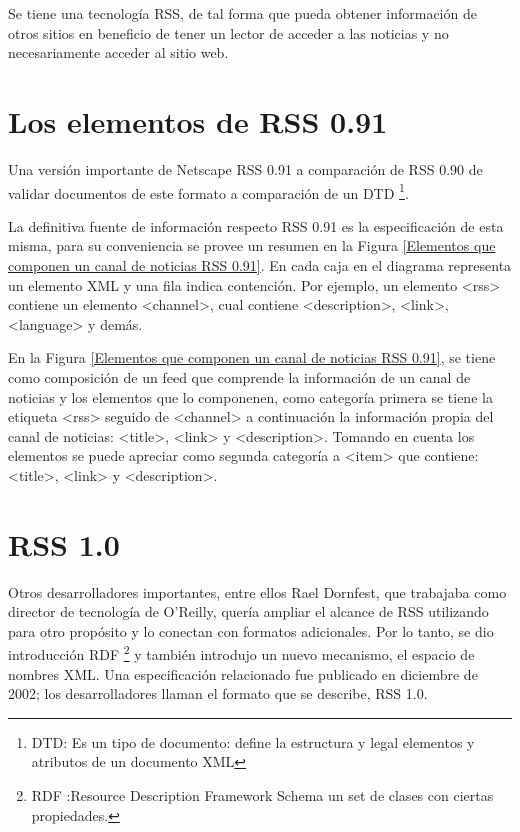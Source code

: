 Se tiene una tecnolog\'{i}a RSS, de tal forma que pueda obtener informaci\'{o}n de
otros sitios en beneficio de tener un lector de acceder a las noticias y no necesariamente
acceder al sitio web.

\section{Los elementos de RSS 0.91}

Una versi\'{o}n importante de Netscape RSS 0.91 a comparaci\'{o}n de RSS 0.90 de
validar documentos de este formato a comparaci\'{o}n de un DTD \footnote{DTD: Es un 
tipo de documento: define la estructura y legal elementos y atributos de un documento XML}. 

La definitiva fuente de informaci\'{o}n respecto RSS 0.91 es la especificaci\'{o}n de
esta misma, para su conveniencia se provee un resumen en la Figura \ref{Elementos
que componen un canal de noticias RSS 0.91}. En cada caja en el diagrama
representa un elemento XML y una fila indica contenci\'{o}n. Por ejemplo, un elemento
<rss> contiene un elemento <channel>, cual contiene <description>, <link>, <language> y dem\'{a}s.
\cite{johnson2006rss}

En la Figura \ref{Elementos que componen un canal de noticias RSS 0.91}, se tiene como
composici\'{o}n de un feed que comprende la informaci\'{o}n de un canal de noticias y
los elementos que lo componenen, como categor\'{i}a primera se tiene la etiqueta <rss>
seguido de <channel> a continuaci\'{o}n la informaci\'{o}n propia del canal de noticias:
<title>, <link> y <description>. Tomando en cuenta los elementos se puede apreciar como
segunda categor\'{i}a a <item> que contiene: <title>, <link> y <description>.   

\begin{minipage}{1.0\textwidth}
	\centering
	\label{Elementos que componen un canal de noticias RSS 0.91}
\end{minipage}


\section{RSS 1.0}

Otros desarrolladores importantes, entre ellos Rael Dornfest, que 
trabajaba como director de tecnolog\'{i}a de O'Reilly, quer\'{i}a ampliar el 
alcance de RSS utilizando para otro prop\'{o}sito y lo conectan con formatos
adicionales. Por lo tanto, se dio introducci\'{o}n RDF \footnote{RDF :Resource
Description Framework Schema un set de clases con ciertas propiedades.} y 
tambi\'{e}n introdujo un nuevo mecanismo, el espacio de nombres XML. Una 
especificaci\'{o}n relacionado fue publicado en diciembre de 2002; los 
desarrolladores llaman el formato que se describe, RSS 1.0.\cite{johnson2006rss}

